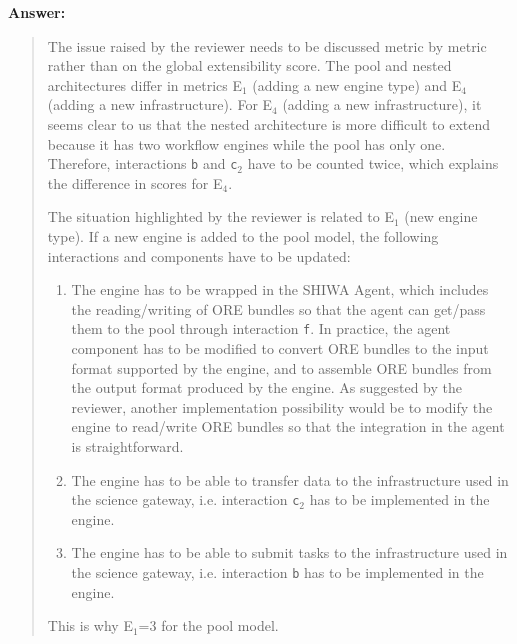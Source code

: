 \documentclass[a4]{article}
\newenvironment{answer}%
{\textbf{Answer:}\begin{small}\begin{quote}}%
{\end{quote}\end{small}}%
\begin{document}
\begin{answer}
  The issue raised by the reviewer needs to be discussed metric by
  metric rather than on the global extensibility score. The pool and
  nested architectures differ in metrics E$_1$ (adding a new engine
  type) and E$_4$ (adding a new infrastructure). For E$_4$ (adding a
  new infrastructure), it seems clear to us that the nested
  architecture is more difficult to extend because it has two workflow
  engines while the pool has only one. Therefore, interactions
  \texttt{b} and \texttt{c$_2$} have to be counted twice, which
  explains the difference in scores for E$_4$. 

  The situation highlighted by the reviewer is related to E$_1$ (new
  engine type). If a new engine is added to the pool model, the
  following interactions and components have to be updated:
 \begin{enumerate}
 \item The engine has to be wrapped in the SHIWA Agent, which includes
   the reading/writing of ORE bundles so that the agent can get/pass
   them to the pool through interaction \texttt{f}. In practice, the
   agent component has to be modified to convert ORE bundles to the
   input format supported by the engine, and to assemble ORE bundles
   from the output format produced by the engine. As suggested by the
   reviewer, another implementation possibility would be to modify the
   engine to read/write ORE bundles so that the integration in the
   agent is straightforward.
 \item The engine has to be able to transfer data to the
   infrastructure used in the science gateway, i.e. interaction
   \texttt{c$_2$} has to be implemented in the engine.
 \item The engine has to be able to submit tasks to the infrastructure
   used in the science gateway, i.e. interaction \texttt{b} has to be
   implemented in the engine.
 \end{enumerate}
This is why E$_1$=3 for the pool model.


\end{answer}
\end{document}
